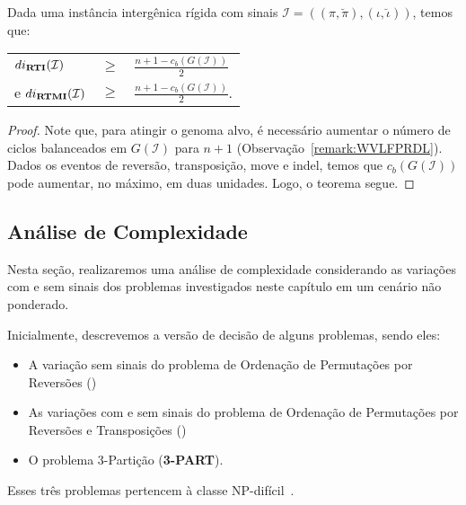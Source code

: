 \begin{theorem}\label{theorem:ZZBNVROM}
Dada uma instância intergênica rígida com sinais $\mathcal{I} = ((\pi,\breve\pi),(\iota,\breve\iota))$, temos que:

\begin{tabular}{lll}
  $di_{\textbf{RTI}}(\mathcal{I})$       & $ \ge $ & $\frac{{n + 1} - c_b(G(\mathcal{I}))}{2}$ \\
  e $di_{\textbf{RTMI}}(\mathcal{I})$    & $ \ge $ & $\frac{{n + 1} - c_b(G(\mathcal{I}))}{2}$. \\
\end{tabular}
\end{theorem}
\begin{proof}
Note que, para atingir o genoma alvo, é necessário aumentar o número de ciclos balanceados em $G(\mathcal{I})$ para $n+1$ (Observação~\ref{remark:WVLFPRDL}). Dados os eventos de reversão, transposição, move e indel, temos que $c_b(G(\mathcal{I}))$ pode aumentar, no máximo, em duas unidades. Logo, o teorema segue.
\end{proof}

\subsection{Análise de Complexidade}

Nesta seção, realizaremos uma análise de complexidade considerando as variações com e sem sinais dos problemas investigados neste capítulo em um cenário não ponderado.

Inicialmente, descrevemos a versão de decisão de alguns problemas, sendo eles:
\begin{itemize}
  \item A variação sem sinais do problema de Ordenação de Permutações por Reversões (\SbR)
  \item As variações com e sem sinais do problema de Ordenação de Permutações por Reversões e Transposições (\SbRT)
  \item O problema $3$-Partição (\textbf{3-PART}).
\end{itemize}
Esses três problemas pertencem à classe NP-difícil~\cite{1999a-caprara,2019b-oliveira-etal,1990-garey-johnson}.

\begin{decision}
\end{decision}

